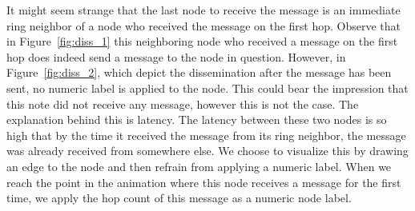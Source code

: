 It might seem strange that the last node to receive the message is an
immediate ring neighbor of a node who received the message on the first
hop. Observe that in Figure~\ref{fig:diss_1} this neighboring node who
received a message on the first hop does indeed send a message to the
node in question. However, in Figure~\ref{fig:diss_2}, which depict the
dissemination after the message has been sent, no numeric label is
applied to the node. This could bear the impression that this note did
not receive any message, however this is not the case. The explanation
behind this is latency. The latency between these two nodes is so high
that by the time it received the message from its ring neighbor, the
message was already received from somewhere else. We choose to visualize
this by drawing an edge to the node and then refrain from applying a
numeric label. When we reach the point in the animation where this node
receives a message for the first time, we apply the hop count of this
message as a numeric node label.

